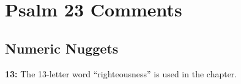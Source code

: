\section{Psalm 23 Comments}

\subsection{Numeric Nuggets}
\textbf{13:} The 13-letter word ``righteousness'' is used in the chapter.